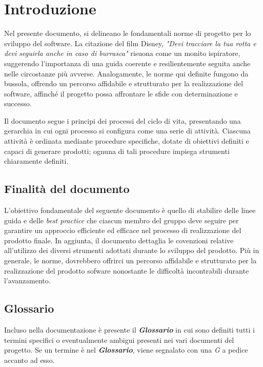 \documentclass{article}
\begin{document}
\pagebreak

\maketitle
\thispagestyle{fancy}
\tableofcontents
{}
\pagebreak


\flushleft
\section{Introduzione}
Nel presente documento, si delineano le fondamentali norme di progetto per lo sviluppo del software. La citazione del film Disney, \emph{"Devi tracciare la tua rotta e devi seguirla anche in caso di burrasca"} risuona come un monito ispiratore, suggerendo l'importanza di una guida coerente e resilientemente seguita anche nelle circostanze più avverse. Analogamente, le norme qui definite fungono da bussola, offrendo un percorso affidabile e strutturato per la realizzazione del software, affinché il progetto possa affrontare le sfide con determinazione e successo.

Il documento segue i principi dei processi del ciclo di vita, presentando una gerarchia in cui ogni processo si configura come una serie di attività. Ciascuna attività è ordinata mediante procedure specifiche, dotate di obiettivi definiti e capaci di generare prodotti; ognuna di tali procedure impiega strumenti chiaramente definiti.

\subsection{Finalità del documento}
L'obiettivo fondamentale del seguente documento è quello di stabilire delle linee guida e delle \textit{best practice} che ciascun membro del gruppo deve seguire per garantire un approccio efficiente ed efficace nel processo di realizzazione del prodotto finale. In aggiunta, il documento dettaglia le covenzioni relative all'utilizzo dei diversi strumenti adottati durante lo sviluppo del prodotto.
Più in generale, le norme, dovrebbero offrirci un percorso affidabile e strutturato per la realizzazione del prodotto sofware nonostante le difficoltà incontrabili durante l'avanzamento.

\subsection{Glossario}
Incluso nella documentazione è presente il \textbf{\textit{Glossario}} in cui sono definiti tutti i termini specifici o eventualmente ambigui presenti nei vari documenti del progetto. Se un termine è nel \textbf{\textit{Glossario}}, viene segnalato con una \textit{G} a pedice accanto ad esso.
\end{document}
